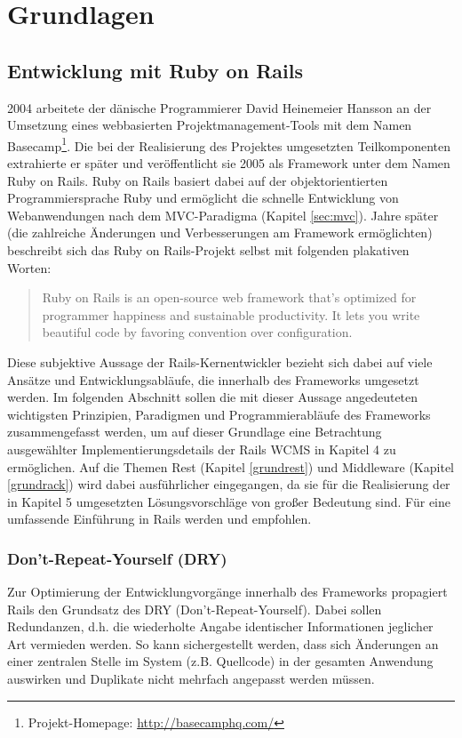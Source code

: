 \chapter{Grundlagen}

\section{Entwicklung mit Ruby on Rails}

2004 arbeitete der dänische Programmierer David Heinemeier Hansson an der Umsetzung eines webbasierten Projektmanagement-Tools mit dem Namen Basecamp\footnote{Projekt-Homepage: \href{http://basecamphq.com/}{http://basecamphq.com/}}. Die bei der Realisierung des Projektes umgesetzten Teilkomponenten extrahierte er später und veröffentlicht sie 2005 als Framework unter dem Namen Ruby on Rails.
Ruby on Rails basiert dabei auf der objektorientierten Programmiersprache Ruby und ermöglicht die schnelle Entwicklung von Webanwendungen nach dem MVC-Paradigma (Kapitel \ref{sec:mvc}).
 Jahre später (die zahlreiche Änderungen und Verbesserungen am Framework ermöglichten) beschreibt sich das Ruby on Rails-Projekt selbst mit folgenden plakativen Worten:
\begin{quote}
Ruby on Rails is an open-source web framework that’s
optimized for programmer happiness and sustainable
productivity. It lets you write beautiful code by
favoring convention over configuration. \cite{RailsStatement}
\end{quote}

Diese subjektive Aussage der Rails-Kernentwickler bezieht sich dabei auf viele Ansätze und Entwicklungsabläufe, die innerhalb des Frameworks umgesetzt werden.
Im folgenden Abschnitt sollen die mit dieser Aussage angedeuteten wichtigsten Prinzipien, Paradigmen und Programmierabläufe des Frameworks zusammengefasst werden, um auf dieser Grundlage eine Betrachtung ausgewählter Implementierungsdetails der Rails WCMS in Kapitel 4 zu ermöglichen. Auf die Themen Rest (Kapitel \ref{grundrest}) und Middleware (Kapitel \ref{grundrack}) wird dabei ausführlicher eingegangen, da sie für die Realisierung der in Kapitel 5 umgesetzten Lösungsvorschläge von großer Bedeutung sind.
\newline
\newline
Für eine umfassende Einführung in Rails werden \cite{RubyMetaprogramming2010} und \cite{EnterpriseRails} empfohlen.

\subsection{Don't-Repeat-Yourself (DRY)}
Zur Optimierung der Entwicklungvorgänge innerhalb des Frameworks propagiert Rails den Grundsatz des DRY (Don't-Repeat-Yourself). Dabei sollen Redundanzen, d.h. die wiederholte Angabe identischer Informationen jeglicher Art vermieden werden. So kann sichergestellt werden, dass sich Änderungen an einer zentralen Stelle im System (z.B. Quellcode) in der gesamten Anwendung auswirken und Duplikate nicht mehrfach angepasst werden müssen.
